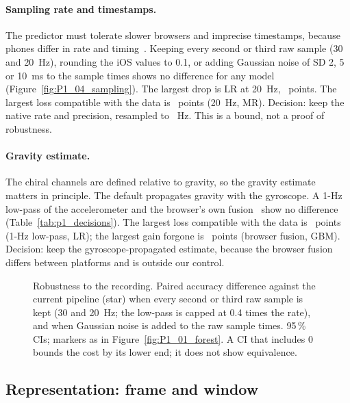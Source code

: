 \paragraph{Sampling rate and timestamps.} The predictor must tolerate slower browsers and imprecise
timestamps, because phones differ in rate and timing~\cite{stisen2015heterogeneity}. Keeping every second
or third raw sample (30 and 20~Hz), rounding the iOS values to 0.1, or adding Gaussian noise of SD 2, 5 or
10~ms to the sample times shows no difference for any model (Figure~\ref{fig:P1_04_sampling}). The largest
drop is LR at 20~Hz, ~points. The largest loss compatible with the data is
~points (20~Hz, MR). Decision: keep the native rate and precision, resampled to
~Hz. This is a bound, not a proof of robustness.

\paragraph{Gravity estimate.} The chiral channels are defined relative to gravity, so the gravity estimate
matters in principle. The default propagates gravity with the gyroscope. A 1-Hz low-pass of the
accelerometer and the browser's own fusion~\cite{w3c2025deviceorientation} show no difference
(Table~\ref{tab:p1_decisions}). The largest loss compatible with the data is
~points (1-Hz low-pass, LR); the largest gain forgone is
~points (browser fusion, GBM). Decision: keep the gyroscope-propagated
estimate, because the browser fusion differs between platforms and is outside our control.

\begin{figure}[htbp]
\centering
{}
\caption{Robustness to the recording. Paired accuracy difference against the current pipeline (star) when
every second or third raw sample is kept (30 and 20~Hz; the low-pass is capped at 0.4 times the rate), and
when Gaussian noise is added to the raw sample times. 95\,\% CIs; markers as in
Figure~\ref{fig:P1_01_forest}. A CI that includes 0 bounds the cost by its lower end; it does not show
equivalence.}
\label{fig:P1_04_sampling}\label{fig:app:prep-sampling}
\end{figure}

\subsection{Representation: frame and window}\label{app:prep:frame}

